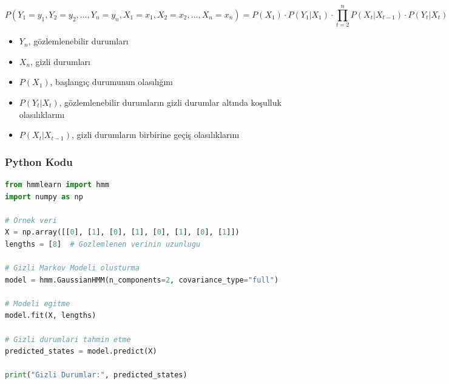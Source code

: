 \[P(Y_1=y_1, Y_2=y_2, ..., Y_n=y_n, X_1=x_1, X_2=x_2, ..., X_n=x_n) = P(X_1) \cdot P(Y_1|X_1) \cdot \prod_{t=2}^{n} P(X_t|X_{t-1}) \cdot P(Y_t|X_t)\]
\begin{itemize}
    \item $Y_{n}$, gözlemlenebilir durumları
    \item $X_{n}$, gizli durumları
    \item $P(X_1)$, başlangıç durumunun olasılığını
    \item $P(Y_{t} | X_{t})$, gözlemlenebilir durumların gizli durumlar altında koşulluk olasılıklarını
    \item $P(X_{t} | X_{t-1})$, gizli durumların birbirine geçiş olasılıklarını
\end{itemize}

\subsubsection{Python Kodu}

\begin{lstlisting}[language=Python]
from hmmlearn import hmm
import numpy as np

# Ornek veri
X = np.array([[0], [1], [0], [1], [0], [1], [0], [1]])
lengths = [8]  # Gozlemlenen verinin uzunlugu

# Gizli Markov Modeli olusturma
model = hmm.GaussianHMM(n_components=2, covariance_type="full")

# Modeli egitme
model.fit(X, lengths)

# Gizli durumlari tahmin etme
predicted_states = model.predict(X)

print("Gizli Durumlar:", predicted_states)
\end{lstlisting}

\newpage